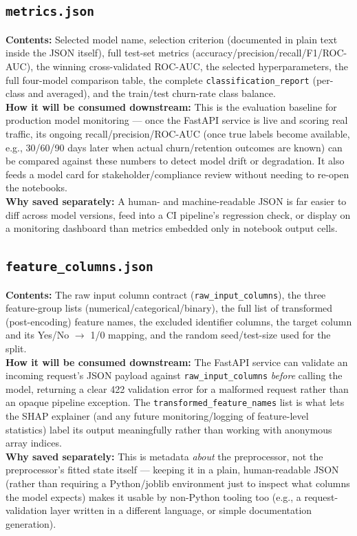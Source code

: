 \documentclass[11pt]{article}
\begin{document}
\subsection{\texttt{metrics.json}}
\textbf{Contents:} Selected model name, selection criterion (documented in plain text inside the JSON itself), full test-set metrics (accuracy/precision/recall/F1/ROC-AUC), the winning cross-validated ROC-AUC, the selected hyperparameters, the full four-model comparison table, the complete \texttt{classification\_report} (per-class and averaged), and the train/test churn-rate class balance.\\
\textbf{How it will be consumed downstream:} This is the evaluation baseline for production model monitoring --- once the FastAPI service is live and scoring real traffic, its ongoing recall/precision/ROC-AUC (once true labels become available, e.g., 30/60/90 days later when actual churn/retention outcomes are known) can be compared against these numbers to detect model drift or degradation. It also feeds a model card for stakeholder/compliance review without needing to re-open the notebooks.\\
\textbf{Why saved separately:} A human- and machine-readable JSON is far easier to diff across model versions, feed into a CI pipeline's regression check, or display on a monitoring dashboard than metrics embedded only in notebook output cells.

\subsection{\texttt{feature\_columns.json}}
\textbf{Contents:} The raw input column contract (\texttt{raw\_input\_columns}), the three feature-group lists (numerical/categorical/binary), the full list of transformed (post-encoding) feature names, the excluded identifier columns, the target column and its Yes/No $\to$ 1/0 mapping, and the random seed/test-size used for the split.\\
\textbf{How it will be consumed downstream:} The FastAPI service can validate an incoming request's JSON payload against \texttt{raw\_input\_columns} \emph{before} calling the model, returning a clear 422 validation error for a malformed request rather than an opaque pipeline exception. The \texttt{transformed\_feature\_names} list is what lets the SHAP explainer (and any future monitoring/logging of feature-level statistics) label its output meaningfully rather than working with anonymous array indices.\\
\textbf{Why saved separately:} This is metadata \emph{about} the preprocessor, not the preprocessor's fitted state itself --- keeping it in a plain, human-readable JSON (rather than requiring a Python/joblib environment just to inspect what columns the model expects) makes it usable by non-Python tooling too (e.g., a request-validation layer written in a different language, or simple documentation generation).
\end{document}
